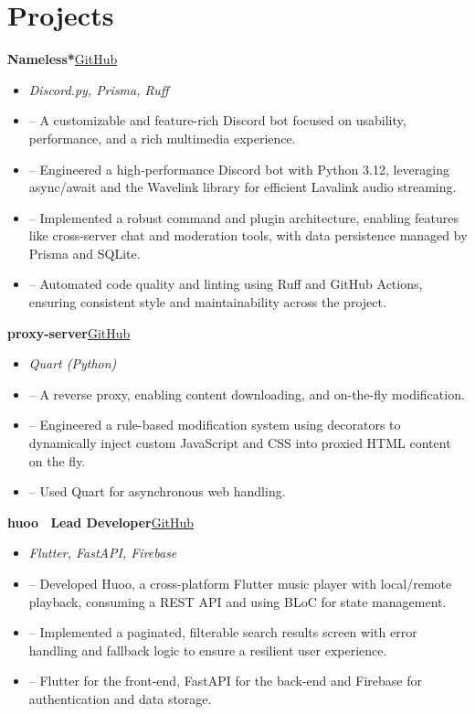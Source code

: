 \documentclass[a4paper,12pt]{article}
\newenvironment{itemList}[3][]
    {
    \noindent\hspace{1em}\textbf{#2}\hfill#3\\[3.75pt]
    \begin{minipage}[t]{\linewidth}
    \begin{itemize}[nosep,after=\strut, leftmargin=2em, itemsep=3pt, label={}, #1]
    }
    {
    \end{itemize}
    \end{minipage}
    }
\newcommand{\listSubHeading}[1]{
    \item[] \noindent\hspace{-1em}\textit{#1}
    }
\begin{document}
\section{Projects}
\begin{itemList}{Nameless*}{\href{https://github.com/foxeiz/nameless-discord-bot/}{GitHub}}
    \listSubHeading{Discord.py, Prisma, Ruff}
    \item -- A customizable and feature-rich Discord bot focused on usability, performance, and a rich multimedia experience.
    \item -- Engineered a high-performance Discord bot with Python 3.12, leveraging async/await and the Wavelink library for efficient Lavalink audio streaming.
    \item -- Implemented a robust command and plugin architecture, enabling features like cross-server chat and moderation tools, with data persistence managed by Prisma and SQLite.
    \item -- Automated code quality and linting using Ruff and GitHub Actions, ensuring consistent style and maintainability across the project.
\end{itemList}

\begin{itemList}{proxy-server}{\href{https://github.com/foxeiz/proxy-server/}{GitHub}}
    \listSubHeading{Quart (Python)}
    \item -- A reverse proxy, enabling content downloading, and on-the-fly modification.
    \item -- Engineered a rule-based modification system using decorators to dynamically inject custom JavaScript and CSS into proxied HTML content on the fly.
    \item -- Used Quart for asynchronous web handling.
\end{itemList}

\newpage

\begin{itemList}{huoo \textbar\ Lead Developer}{\href{https://github.com/foxeiz/huoo/}{GitHub}}
    \listSubHeading{Flutter, FastAPI, Firebase}
    \item -- Developed Huoo, a cross-platform Flutter music player with local/remote playback, consuming a REST API and using BLoC for state management.
    \item -- Implemented a paginated, filterable search results screen with error handling and fallback logic to ensure a resilient user experience.
    \item -- Flutter for the front-end, FastAPI for the back-end and Firebase for authentication and data storage.
\end{itemList}
\end{document}
